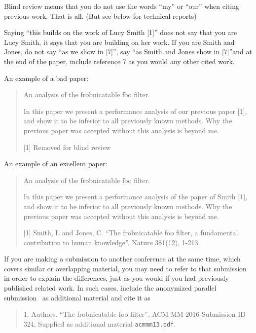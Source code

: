 \documentclass{article}
\begin{document}
Blind review means that you do not use the words ``my'' or ``our'' when citing previous work. That is all. (But see below for technical reports)

Saying ``this builds on the work of Lucy Smith [1]'' does not say that you are Lucy Smith, it says that you are building on her work. If you are Smith and Jones, do not say ``as we show in [7]'', say ``as Smith and Jones show in [7]''and at the end of the paper, include reference 7 as you would any other cited work.

An example of a bad paper:
\begin{quote}
\begin{center}
    An analysis of the frobnicatable foo filter.
\end{center}

   In this paper we present a performance analysis of our
   previous paper [1], and show it to be inferior to all
   previously known methods. Why the previous paper was
   accepted without this analysis is beyond me.

   [1] Removed for blind review
\end{quote}

An example of an excellent paper:

\begin{quote}
\begin{center}
     An analysis of the frobnicatable foo filter.
\end{center}

   In this paper we present a performance analysis of the
   paper of Smith [1], and show it to be inferior to
   all previously known methods.  Why the previous paper
   was accepted without this analysis is beyond me.

   [1] Smith, L and Jones, C. ``The frobnicatable foo
   filter, a fundamental contribution to human knowledge''.
   Nature 381(12), 1-213.
\end{quote}

If you are making a submission to another conference at the same time, which covers similar or overlapping material, you may need to refer to that submission in order to explain the differences, just as you would if you had previously published related work. In such cases, include the anonymized parallel submission~\cite{Authors12} as additional material and cite it as

\begin{quote}
1. Authors. ``The frobnicatable foo filter'', ACM MM 2016 Submission ID 324, Supplied as additional material {\tt acmmm13.pdf}.
\end{quote}
\end{document}
